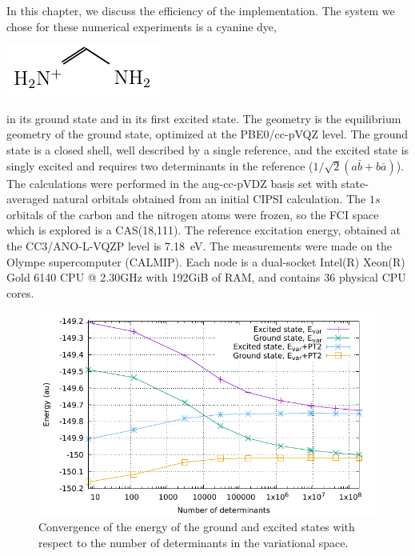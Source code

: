 \documentclass[./thesis.tex]{subfiles}
\begin{document}
\label{chap:PERF}

In this chapter, we discuss the efficiency of the implementation. The system
we chose for these numerical experiments is a cyanine dye, \\
\begin{center}
\includegraphics[]{figures/perf/Cyanine} \\
\end{center}
in its ground state and in its first excited state.
The geometry is the equilibrium geometry of the ground state, optimized at the
PBE0/cc-pVQZ level. The ground state is a closed shell, well described by a
single reference, and the excited state is singly excited and requires two
determinants in the reference ($1/\sqrt{2} (a\bar{b} + b\bar{a})$).  The
calculations were performed in the aug-cc-pVDZ basis set with state-averaged
natural orbitals obtained from an initial CIPSI calculation.
The $1s$ orbitals of the carbon and the nitrogen atoms were frozen, so
the FCI space which is explored is a CAS(18,111). The reference excitation
energy, obtained at the CC3/ANO-L-VQZP level is 7.18~eV.\cite{Send_2011}
The measurements were made on the Olympe supercomputer (CALMIP). Each node is 
a dual-socket Intel(R) Xeon(R) Gold 6140 CPU @ 2.30GHz with 192GiB of RAM, and
contains 36 physical CPU cores.

\begin{figure}[hbt]
	\begin{center}
		\includegraphics[width=0.8\columnwidth]{figures/perf/cn3_energy}
		\caption{Convergence of the energy of the ground and excited states with respect to the number of determinants in the variational space.}
		\label{fig:energy_pt2}
	\end{center}
\end{figure}
\end{document}
